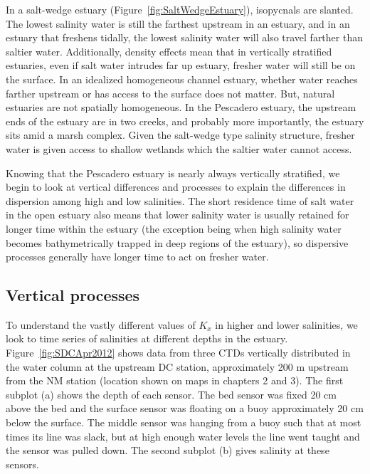 In a salt-wedge estuary (Figure~\ref{fig:SaltWedgeEstuary}), isopycnals are slanted. The lowest salinity water is still the farthest upstream in an estuary, and in an estuary that freshens tidally, the lowest salinity water will also travel farther than saltier water. Additionally, density effects mean that in vertically stratified estuaries, even if salt water intrudes far up estuary, fresher water will still be on the surface. In an idealized homogeneous channel estuary, whether water reaches farther upstream or has access to the surface does not matter. But, natural estuaries are not spatially homogeneous. In the Pescadero estuary, the upstream ends of the estuary are in two creeks, and probably more importantly, the estuary sits amid a marsh complex. Given the salt-wedge type salinity structure, fresher water is given access to shallow wetlands which the saltier water cannot access. 

Knowing that the Pescadero estuary is nearly always vertically stratified, we begin to look at vertical differences and processes to explain the differences in dispersion among high and low salinities. The short residence time of salt water in the open estuary also means that lower salinity water is usually retained for longer time within the estuary (the exception being when high salinity water becomes bathymetrically trapped in deep regions of the estuary), so dispersive processes generally have longer time to act on fresher water. 

\subsection{Vertical processes}

To understand the vastly different values of $K_x$ in higher and lower salinities, we look to time series of salinities at different depths in the estuary. Figure~\ref{fig:SDCApr2012} shows data from three CTDs vertically distributed in the water column at the upstream DC station, approximately 200 m upstream from the NM station (location shown on maps in chapters 2 and 3). The first subplot (a) shows the depth of each sensor. The bed sensor was fixed 20 cm above the bed and the surface sensor was floating on a buoy approximately 20 cm below the surface. The middle sensor was hanging from a buoy such that at most times its line was slack, but at high enough water levels the line went taught and the sensor was pulled down. The second subplot (b) gives salinity at these sensors.

